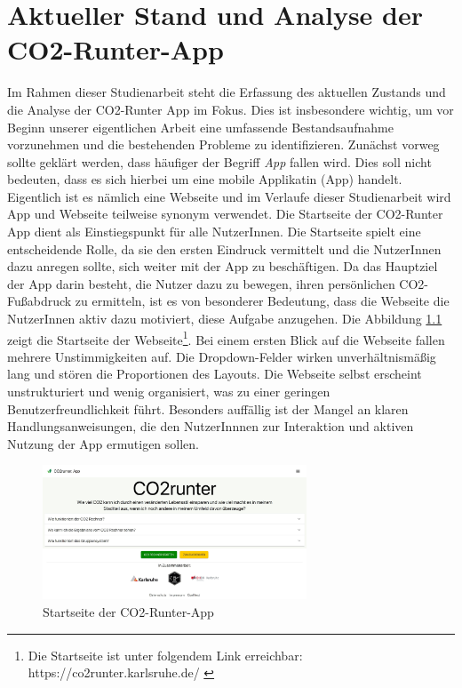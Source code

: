 
\chapter{Aktueller Stand und Analyse der CO2-Runter-App}
\label{chapter:2}

Im Rahmen dieser Studienarbeit steht die Erfassung des aktuellen Zustands und die Analyse der CO2-Runter App im Fokus. Dies ist insbesondere wichtig, um vor Beginn unserer eigentlichen Arbeit eine umfassende Bestandsaufnahme vorzunehmen und die bestehenden Probleme zu identifizieren. Zunächst vorweg sollte geklärt werden, dass häufiger der Begriff \textit{App} fallen wird. Dies soll nicht bedeuten, dass es sich hierbei um eine mobile Applikatin (App) handelt. Eigentlich ist es nämlich eine Webseite und im Verlaufe dieser Studienarbeit wird App und Webseite teilweise synonym verwendet. Die Startseite der CO2-Runter App dient als Einstiegspunkt für alle NutzerInnen. Die Startseite spielt eine entscheidende Rolle, da sie den ersten Eindruck vermittelt und die NutzerInnen dazu anregen sollte, sich weiter mit der App zu beschäftigen. Da das Hauptziel der App darin besteht, die Nutzer dazu zu bewegen, ihren persönlichen CO2-Fußabdruck zu ermitteln, ist es von besonderer Bedeutung, dass die Webseite die NutzerInnen aktiv dazu motiviert, diese Aufgabe anzugehen. Die Abbildung \ref{fig:co2runterapp-landingpage} zeigt die Startseite der Webseite\footnote{Die Startseite ist unter folgendem Link erreichbar: https://co2runter.karlsruhe.de/ \cite{co2runterapp}}. Bei einem ersten Blick auf die Webseite fallen mehrere Unstimmigkeiten auf. Die Dropdown-Felder wirken unverhältnismäßig lang und stören die Proportionen des Layouts. Die Webseite selbst erscheint unstrukturiert und wenig organisiert, was zu einer geringen Benutzerfreundlichkeit führt. Besonders auffällig ist der Mangel an klaren Handlungsanweisungen, die den NutzerInnnen zur Interaktion und aktiven Nutzung der App ermutigen sollen.

\begin{figure}[h]
    \centering
    \includegraphics[width=0.7\textwidth]{images/02/CO2-Runter-App-Landingpage.jpeg}
    \caption{Startseite der CO2-Runter-App}
    \label{fig:co2runterapp-landingpage}
\end{figure}

